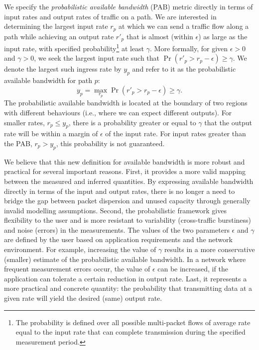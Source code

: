 \documentclass[final,5p,times,twocolumn]{elsarticle}
\begin{document}
We specify the {\em probabilistic available bandwidth} (PAB) metric directly in terms of input rates and output rates of traffic on a path.  We are interested in determining the largest input rate $r_p$ at which we can send a traffic flow along a path while achieving an output rate $r'_p$ that is almost (within $\epsilon$) as large as the input rate, with specified probability\footnote{The probability is defined over all possible multi-packet flows of average rate equal to the input rate that can complete transmission during the specified measurement period.} at least $\gamma$.  More formally, for given $\epsilon > 0$ and $\gamma > 0$, we seek the largest input rate such that $\Pr(r'_p > r_p - \epsilon) \geq \gamma$.  We denote the largest such ingress rate by $y_p$ and refer to it as the probabilistic available bandwidth for path $p$: $$y_p = \max_{r_p} \Pr(r'_p > r_p - \epsilon) \geq \gamma.$$  The probabilistic available bandwidth is located at the boundary of two regions with different behaviours (i.e., where we can expect different outputs).  For smaller rates,  $r_p \leq y_p$, there is a probability greater or equal to $\gamma$ that the output rate will be within a margin of $\epsilon$ of the input rate.  For input rates greater than the PAB, $r_p>y_p$, this probability is not guaranteed.  

We believe that this new definition for available bandwidth is more robust and practical for several important reasons.  First, it provides a more valid mapping between the measured and inferred quantities.  By expressing available bandwidth directly in terms of the input and output rates, there is no longer a need to bridge the gap between packet dispersion and unused capacity through generally invalid modelling assumptions.  Second, the probabilistic framework gives flexibility to the user and is more resistant to variability (cross-traffic burstiness) and noise (errors) in the measurements.  The values of the two parameters $\epsilon$ and $\gamma$ are defined by the user based on application requirements and the network environment.  For example, increasing the value of $\gamma$ results in a more conservative (smaller) estimate of the probabilistic available bandwidth.  In a network where frequent measurement errors occur, the value of $\epsilon$ can be increased, if the application can tolerate a certain reduction in output rate.  Last, it represents a more practical and concrete quantity: the probability that transmitting data at a given rate will yield the desired (same) output rate.
\end{document}
